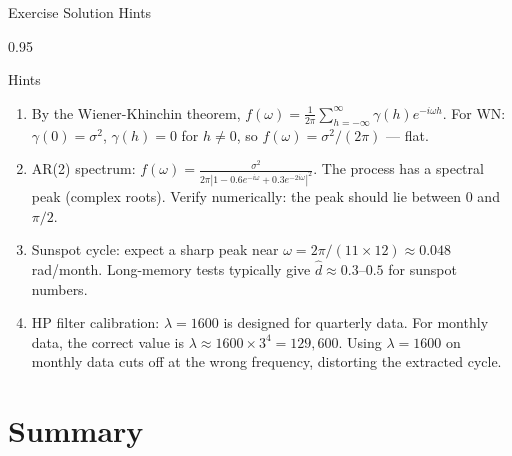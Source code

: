 \documentclass[9pt, aspectratio=169, t]{beamer}
\begin{document}
\begin{frame}{Exercise Solution Hints}
    \begin{cminipage}{0.95\textwidth}
    \vspace{-0.3cm}
    {\footnotesize
    \begin{block}{Hints}
        \begin{enumerate}\setlength{\itemsep}{1pt}
            \item By the Wiener-Khinchin theorem, $f(\omega) = \frac{1}{2\pi}\sum_{h=-\infty}^{\infty}\gamma(h)e^{-i\omega h}$. For WN: $\gamma(0)=\sigma^2$, $\gamma(h)=0$ for $h\neq 0$, so $f(\omega) = \sigma^2/(2\pi)$ --- flat.

            \item AR(2) spectrum: $f(\omega) = \frac{\sigma^2}{2\pi|1 - 0.6e^{-i\omega} + 0.3e^{-2i\omega}|^2}$. The process has a spectral peak (complex roots). Verify numerically: the peak should lie between 0 and $\pi/2$.

            \item Sunspot cycle: expect a sharp peak near $\omega = 2\pi/(11 \times 12) \approx 0.048$ rad/month. Long-memory tests typically give $\hat{d} \approx 0.3$--$0.5$ for sunspot numbers.

            \item HP filter calibration: $\lambda = 1600$ is designed for quarterly data. For monthly data, the correct value is $\lambda \approx 1600 \times 3^4 = 129{,}600$. Using $\lambda=1600$ on monthly data cuts off at the wrong frequency, distorting the extracted cycle.
        \end{enumerate}
    \end{block}
    }
    \end{cminipage}
\end{frame}

\section{Summary}
\end{document}
